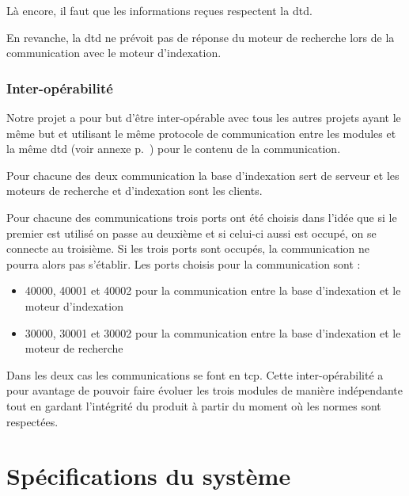 \documentclass[a4paper,12pt]{report}
\begin{document}
Là encore, il faut que les informations reçues respectent la \gls{dtd}.

En revanche, la \gls{dtd} ne prévoit pas de réponse du moteur de recherche lors de la communication avec le moteur d'indexation.

\subsection{Inter-opérabilité}\label{inter_operabilite}
Notre projet a pour but d'être inter-opérable avec tous les autres projets ayant le même but et utilisant le même protocole de communication entre les modules et la même \gls{dtd} (voir annexe p.~\pageref{dtd}) pour le contenu de la communication.

Pour chacune des deux communication la base d'indexation sert de serveur et les moteurs de recherche et d'indexation sont les clients.

Pour chacune des communications trois ports ont été choisis dans l'idée que si le premier est utilisé on passe au deuxième et si celui-ci aussi est occupé, on se connecte au troisième. Si les trois ports sont occupés, la communication ne pourra alors pas s'établir. Les ports choisis pour la communication sont :
\begin{itemize}
\item 40000, 40001 et 40002 pour la communication entre la base d'indexation et le moteur d'indexation
\item 30000, 30001 et 30002 pour la communication entre la base d'indexation et le moteur de recherche
\end{itemize}
Dans les deux cas les communications se font en \gls{tcp}.
Cette inter-opérabilité a pour avantage de pouvoir faire évoluer les trois modules de manière indépendante tout en gardant l'intégrité du produit à partir du moment où les normes sont respectées.

\chapter{Spécifications du système}
\end{document}
